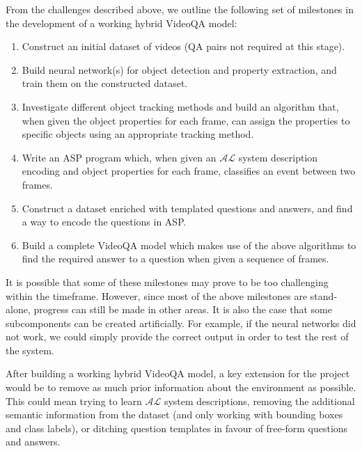 \documentclass[../interim.tex]{subfiles}
\begin{document}
From the challenges described above, we outline the following set of milestones in the development of a working hybrid VideoQA model:
\begin{enumerate}
  \item Construct an initial dataset of videos (QA pairs not required at this stage).

  \item Build neural network(s) for object detection and property extraction, and train them on the constructed dataset.

  \item Investigate different object tracking methods and build an algorithm that, when given the object properties for each frame, can assign the properties to specific objects using an appropriate tracking method.

  \item Write an ASP program which, when given an $\mathcal{AL}$ system description encoding and object properties for each frame, classifies an event between two frames.

  \item Construct a dataset enriched with templated questions and answers, and find a way to encode the questions in ASP.

  \item Build a complete VideoQA model which makes use of the above algorithms to find the required answer to a question when given a sequence of frames.
\end{enumerate}

It is possible that some of these milestones may prove to be too challenging within the timeframe. However, since most of the above milestones are stand-alone, progress can still be made in other areas. It is also the case that some subcomponents can be created artificially. For example, if the neural networks did not work, we could simply provide the correct output in order to test the rest of the system.

After building a working hybrid VideoQA model, a key extension for the project would be to remove as much prior information about the environment as possible. This could mean trying to learn $\mathcal{AL}$ system descriptions, removing the additional semantic information from the dataset (and only working with bounding boxes and class labels), or ditching question templates in favour of free-form questions and answers.
\end{document}
